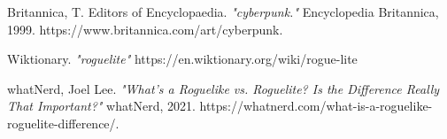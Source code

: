 \documentclass[10pt,conference,onecolumn,compsoc]{IEEEtran}
\begin{document}
\begin{thebibliography}{1}

Britannica, T. Editors of Encyclopaedia. \emph{"cyberpunk."} Encyclopedia Britannica, 1999. https://www.britannica.com/art/cyberpunk.

Wiktionary. \emph{"roguelite"}
https://en.wiktionary.org/wiki/rogue-lite

whatNerd, Joel Lee. \emph{"What’s a Roguelike vs. Roguelite? Is the Difference Really That Important?"} whatNerd, 2021. https://whatnerd.com/what-is-a-roguelike-roguelite-difference/.

\end{thebibliography}

\end{document}
